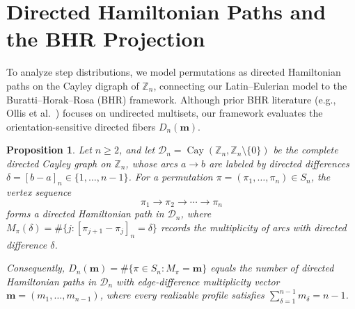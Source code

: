 \documentclass[11pt,a4paper]{amsart}
\newtheorem{proposition}[theorem]{Proposition}
\newcommand{\1}{\mathbf{1}}
\begin{document}
\section{Directed Hamiltonian Paths and the BHR Projection}
To analyze step distributions, we model permutations as directed Hamiltonian paths on the Cayley digraph of $\mathbb{Z}_n$, connecting our Latin--Eulerian model to the Buratti--Horak--Rosa (BHR) framework. Although prior BHR literature (e.g., Ollis et al.~\cite{OllisPasottiPellegriniSchmitt2021}) focuses on undirected multisets, our framework evaluates the orientation-sensitive directed fibers $D_n(\mathbf{m})$.

\begin{proposition}\label{Cay}
Let $n \ge 2$, and let $\mathcal{D}_n = \operatorname{Cay}(\mathbb{Z}_n, \mathbb{Z}_n \setminus \{0\})$ be the complete directed Cayley graph on $\mathbb{Z}_n$, whose arcs $a \longrightarrow b$ are labeled by directed differences $\delta = [b-a]_n \in \{1, \ldots, n-1\}$. For a permutation $\pi = (\pi_1, \ldots, \pi_n) \in S_n$, the vertex sequence
\[
\pi_1 \longrightarrow \pi_2 \longrightarrow \cdots \longrightarrow \pi_n
\]
forms a directed Hamiltonian path in $\mathcal{D}_n$, where $M_\pi(\delta) = \#\{j : [\pi_{j+1} - \pi_j]_n = \delta\}$ records the multiplicity of arcs with directed difference $\delta$.

Consequently, $D_n(\mathbf{m}) = \#\{\pi \in S_n : M_\pi = \mathbf{m}\}$ equals the number of directed Hamiltonian paths in $\mathcal{D}_n$ with edge-difference multiplicity vector $\mathbf{m} = (m_1, \ldots, m_{n-1})$, where every realizable profile satisfies $\sum_{\delta=1}^{n-1} m_\delta = n-1$.
\end{proposition}
\end{document}

